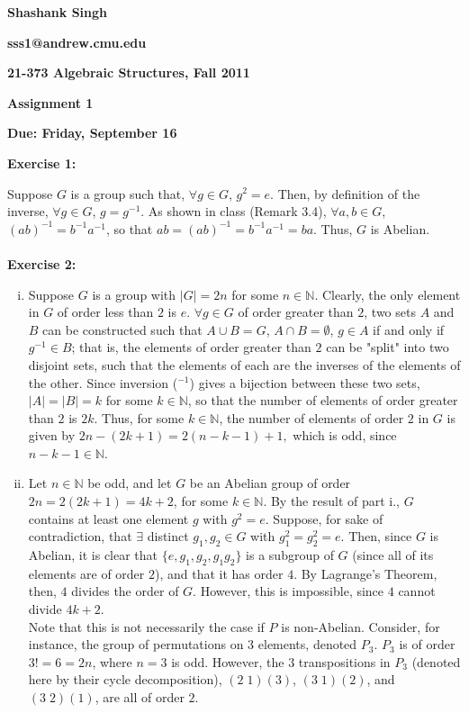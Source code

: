 \documentclass{article}%
\begin{document}
\begin{center}
\textbf{Shashank Singh}

\textbf{sss1@andrew.cmu.edu}

\textbf{21-373 \quad Algebraic Structures, Fall 2011}

\textbf{Assignment 1}

\textbf{Due: Friday, September 16}\\
\end{center}
\textbf{Exercise 1:} 

Suppose $G$ is a group such that, $\forall g \in G$,
$g^2 = e$. Then, by definition of the inverse, $\forall g \in G$, $g = g^{-1}$.
As shown in class (Remark 3.4), $\forall a, b \in G$,
$(ab)^{-1} = b^{-1}a^{-1}$, so that $ab = (ab)^{-1} = b^{-1}a^{-1} = ba$. Thus,
$G$ is Abelian. \\\\
\textbf{Exercise 2:}
\begin{enumerate}[i.]
	\item  Suppose $G$ is a group with $|G| = 2n$ for some $n \in
\mathbb{N}$. Clearly, the only element in $G$ of order less than $2$ is $e$.
$\forall g \in G$ of order greater than $2$, two sets $A$ and $B$ can be
constructed such that $A \cup B = G$, $A \cap B = \emptyset$, $g \in A$ if and
only if $g^{-1} \in B$; that is, the elements of order greater than $2$ can be
"split" into two disjoint sets, such that the elements of each are the
inverses of the elements of the other. Since inversion ($^{-1}$) gives a
bijection between these two sets, $|A| = |B| = k$ for some $k \in \mathbb{N}$,
so that the number of elements of order greater than $2$ is $2k$. Thus, for
some $k \in \mathbb{N}$, the number of elements of order $2$ in $G$
is given by $2n - (2k + 1) = 2(n - k - 1) + 1,$ which is odd, since
$n - k - 1 \in \mathbb{N}$.

	\item  Let $n \in \mathbb{N}$ be odd, and let $G$ be an
Abelian group of order $2n = 2(2k + 1) = 4k + 2$, for some $k \in \mathbb{N}$.
By the result of part i., $G$ contains at least one element $g$ with $g^2 = e$.
Suppose, for sake of contradiction, that $\exists$ distinct $g_1, g_2 \in G$
with $g_1^2 = g_2^2 = e$. Then, since $G$ is Abelian, it is clear that $\{e,
g_1,g_2,g_1g_2\}$ is a subgroup of $G$ (since all of its elements are of order
$2$), and that it has order $4$. By Lagrange's Theorem, then, $4$ divides the
order of $G$. However, this is impossible, since $4$ cannot divide $4k + 2$.\\
Note that this is not necessarily the case if $P$ is non-Abelian. Consider, for
instance, the group of permutations on $3$ elements, denoted $P_3$. $P_3$ is
of order $3! = 6 = 2n$, where $n = 3$ is odd. However, the $3$ transpositions
in $P_3$ (denoted here by their cycle decomposition), $(2\;1)(3)$, $(3\;1)(2)$,
and $(3\;2)(1)$, are all of order $2$.

\end{enumerate}
\end{document}
